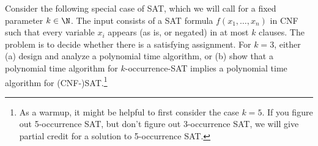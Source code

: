 \documentclass{article}
\begin{document}
\setcounter{section}{9}
\setcounter{exercise}{8}
\begin{exercise}
  Consider the following special case of SAT, which we will call  for a fixed parameter $k \in \N$.
  The input consists of a SAT formula $f (x_1, \ldots, x_n)$ in CNF such that every variable $x_i$ appears (as is, or negated) in at most $k$ clauses.
  The problem is to decide whether there is a satisfying assignment.
  For $k = 3$, either (a) design and analyze a polynomial time algorithm, or (b) show that a polynomial time algorithm for $k$-occurrence-SAT implies a polynomial time algorithm for (CNF-)SAT.\footnote{As a warmup, it might be helpful to first consider the case $k = 5$.
  If you figure out 5-occurrence SAT, but don't figure out 3-occurrence SAT, we will give partial credit for a solution to 5-occurrence SAT.}
\end{exercise}
\end{document}
